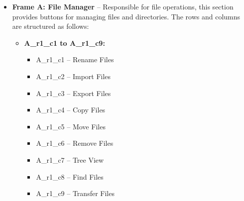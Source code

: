 \documentclass{article}
\begin{document}
\begin{itemize}
    \item \textbf{Frame A: File Manager} – Responsible for file operations, this section provides buttons for managing files and directories. The rows and columns are structured as follows:
    \begin{itemize}
        \item \textbf{A\_r1\_c1 to A\_r1\_c9:} 
        \begin{itemize}
            \item A\_r1\_c1 – Rename Files
            \item A\_r1\_c2 – Import Files
            \item A\_r1\_c3 – Export Files
            \item A\_r1\_c4 – Copy Files
            \item A\_r1\_c5 – Move Files
            \item A\_r1\_c6 – Remove Files
            \item A\_r1\_c7 – Tree View
            \item A\_r1\_c8 – Find Files
            \item A\_r1\_c9 – Transfer Files
        \end{itemize}
    \end{itemize}


\end{itemize}
\end{document}
